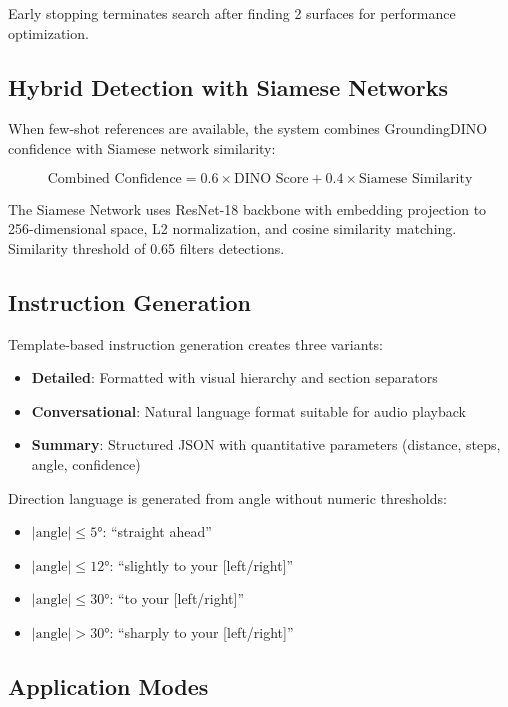 \documentclass{article}
\begin{document}
Early stopping terminates search after finding 2 surfaces for performance optimization.

\subsection{Hybrid Detection with Siamese Networks}

When few-shot references are available, the system combines GroundingDINO confidence with Siamese network similarity:

\[
\text{Combined Confidence} = 0.6 \times \text{DINO Score} + 0.4 \times \text{Siamese Similarity}
\]

The Siamese Network uses ResNet-18 backbone with embedding projection to 256-dimensional space, L2 normalization, and cosine similarity matching. Similarity threshold of 0.65 filters detections.

\subsection{Instruction Generation}

Template-based instruction generation creates three variants:

\begin{itemize}
    \item \textbf{Detailed}: Formatted with visual hierarchy and section separators
    \item \textbf{Conversational}: Natural language format suitable for audio playback
    \item \textbf{Summary}: Structured JSON with quantitative parameters (distance, steps, angle, confidence)
\end{itemize}

Direction language is generated from angle without numeric thresholds:
\begin{itemize}
    \item $|\text{angle}| \leq 5°$: ``straight ahead''
    \item $|\text{angle}| \leq 12°$: ``slightly to your [left/right]''
    \item $|\text{angle}| \leq 30°$: ``to your [left/right]''
    \item $|\text{angle}| > 30°$: ``sharply to your [left/right]''
\end{itemize}

\subsection{Application Modes}
\end{document}
